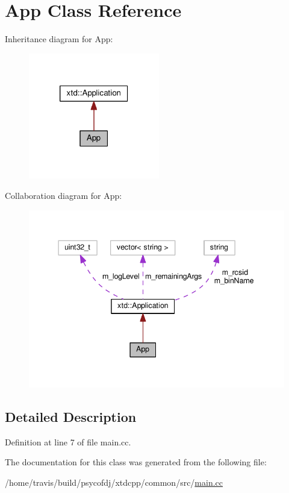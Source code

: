 \hypertarget{classApp}{\section{App Class Reference}
\label{classApp}
}


Inheritance diagram for App\-:
\nopagebreak
\begin{figure}[H]
\begin{center}
\leavevmode
\includegraphics[width=162pt]{classApp__inherit__graph}
\end{center}
\end{figure}


Collaboration diagram for App\-:
\nopagebreak
\begin{figure}[H]
\begin{center}
\leavevmode
\includegraphics[width=340pt]{classApp__coll__graph}
\end{center}
\end{figure}


\subsection{Detailed Description}


Definition at line 7 of file main.\-cc.



The documentation for this class was generated from the following file\-:\begin{DoxyCompactItemize}
\item 
/home/travis/build/psycofdj/xtdcpp/common/src/\hyperlink{main_8cc}{main.\-cc}\end{DoxyCompactItemize}
